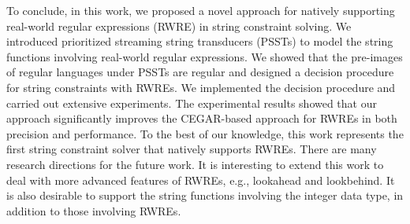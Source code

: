 To conclude, in this work, we proposed a novel approach for natively supporting real-world regular expressions (RWRE) in string constraint solving. We introduced prioritized streaming string transducers (PSSTs) to  model the string functions involving real-world regular expressions. We showed that the pre-images of regular languages under PSSTs are regular and designed a decision procedure for string constraints with RWREs. We implemented the decision procedure and carried out extensive experiments. The experimental results showed that our approach significantly improves the CEGAR-based approach for RWREs in both precision and performance. To the best of our knowledge, this work represents the first string constraint solver that natively supports RWREs. There are many research directions for the future work. It is interesting to extend this work to deal with more advanced features of RWREs, e.g., lookahead and lookbehind. It is also desirable to support the string functions involving the integer data type, in addition to those involving RWREs.
